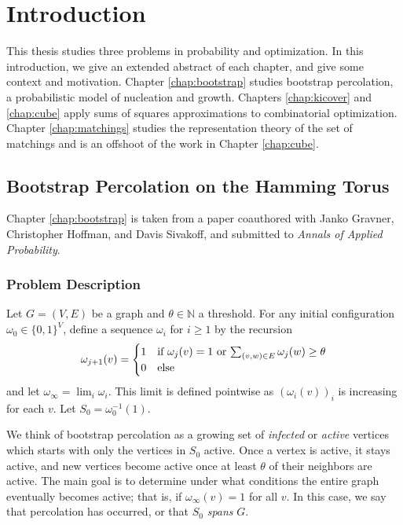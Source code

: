

\chapter{Introduction}
\label{chap:introduction}

This thesis studies three problems in probability and optimization.
In this introduction, we give an extended abstract of each chapter, and give some context and motivation.
Chapter \ref{chap:bootstrap} studies bootstrap percolation, a probabilistic model of nucleation and growth.
Chapters \ref{chap:kicover} and \ref{chap:cube} apply sums of squares approximations to combinatorial optimization.
Chapter \ref{chap:matchings} studies the representation theory of the set of matchings and is an offshoot of the work in Chapter \ref{chap:cube}.

\section{Bootstrap Percolation on the Hamming Torus}
Chapter \ref{chap:bootstrap} is taken from a paper coauthored with Janko Gravner, Christopher Hoffman, and Davis Sivakoff, and submitted to \emph{Annals of Applied Probability}.

\subsection{Problem Description}
\label{section:bootstrap1}
Let $G = (V,E)$ be a graph and $\theta \in \mathbb{N}$ a threshold.
For any initial configuration $\omega_0 \in \{0,1\}^V$, define a sequence $\omega_i$ for $i \ge 1$ by the recursion
$$
\omega_{j+1}(v)=
\begin{cases}
1& \text{if $\omega_j(v)=1$ or $\sum_{(v,w) \in E}\omega_j(w) \geq
\theta$}\\
0 &\text{else}
\end{cases}
$$
and let $\omega_\infty = \lim_i \omega_i$. This limit is defined pointwise as $(\omega_i(v))_i$ is increasing for each $v$.
Let $S_0 = \omega_0^{-1}(1)$.

We think of bootstrap percolation as a growing set of {\em infected} or {\em active} vertices which starts with only the vertices in $S_0$ active.
Once a vertex is active, it stays active, and new vertices become active once at least $\theta$ of their neighbors are active.
The main goal is to determine under what conditions the entire graph eventually becomes active; that is, if $\omega_\infty(v) = 1$ for all $v$.
In this case, we say that percolation has occurred, or that $S_0$ {\em spans} $G$.


